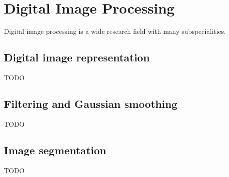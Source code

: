 \section{Digital Image Processing}
Digital image processing is a wide research field with many subspecialities.

\subsection{Digital image representation}
TODO
\subsection{Filtering and Gaussian smoothing}
TODO
\subsection{Image segmentation}
TODO
